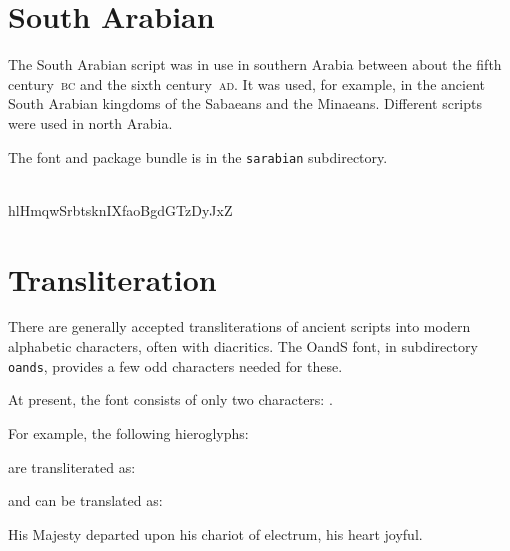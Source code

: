 \documentclass{article}
\newcommand{\BC}{\textsc{bc}}
\newcommand{\AD}{\textsc{ad}}
\begin{document}
\section{South Arabian}

    The South Arabian script was in use in southern Arabia between about the 
fifth century~\BC{} and the sixth century~\AD. It was used, for example,
in the ancient South Arabian kingdoms of the Sabaeans and the Minaeans. 
Different scripts were used in north Arabia.

The font and package bundle is in the \texttt{sarabian} subdirectory.

\begin{center}
\sarabfamily
\SAh \SAl \SAhd \SAm \SAq \SAw \SAsv \SAr \SAb \SAt 
\SAs \SAk \SAn \SAhu \SAsa \SAf \SAa \SAo \SAdd 
\SAg \SAd \SAga \SAtd \SAz \SAdb \SAy \SAtb \SAsd \SAzd \\ 
hlHmqwSrbtsknIXfaoBgdGTzDyJxZ
\end{center}




\clearpage
\section{Transliteration}

    There are generally accepted transliterations of ancient scripts
into modern alphabetic characters, often with diacritics. The
OandS font, in subdirectory \texttt{oands}, provides a few odd 
characters needed for these.

    At present, the font consists of only two characters: .

    For example, the following hieroglyphs:
\begin{center}
\renewcommand{\baselinestretch}{1.2}
\pmglyph{\HU\Hw\HL\HJ\Hf-\Hq:\Hvbar-\HR:{\Hr:\Hr}-\Hy-\Ht:\HN-\Hf-\Hn:\Ht-\Hc\Hm\Hv-\HG:\Hvbar-\Hf\HZ\Hw\HV}
\end{center}
are transliterated as:
\begin{center}
\end{center}
and can be translated as:
\begin{center}
His Majesty departed upon his chariot of electrum, his heart joyful.
\end{center}

\newcommand{\xerxes}{%
 \Oxa\Osva\Oya\Oa\Ora\Osva\Oa\Owd\-%
 \Oxa\Osva\Oa\Oya\Otha\Oi\Oya\Owd\-%
 \Ova\Oza\Ora\Oka\Owd\-%
 \Oxa\Osva\Oa\Oya\Otha\Oi\Oya\Owd\-%
 \Oxa\Osva\Oa\Oya\Otha\Oi\Oya\Oa\Ona\Oa\Oma\Owd\-%
 \Oda\Oa\Ora\Oya\Ova\Oha\Ou\Osva\Owd\-%
 \Oxa\Osva\Oa\Oya\Otha\Oi\Oya\Oha\Oya\Oa\Owd\-%
 \Opa\Ou\Occa\Owd\-%
 \Oha\Oxa\Oa\Oma\Ona\Oi\Osva\Oi\Oya\Owd}
 
\end{document}
